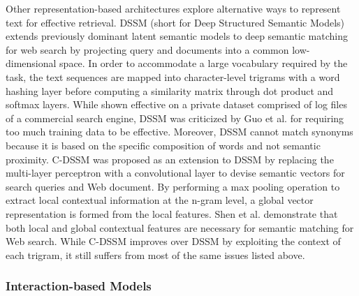 Other representation-based architectures explore alternative ways to represent text for effective retrieval.
DSSM (short for Deep Structured Semantic Models) \cite{huang2013learning} extends previously dominant latent semantic models \cite{blei2003latent, } to deep semantic matching for web search by projecting query and documents into a common low-dimensional space.
In order to accommodate a large vocabulary required by the task, the text sequences are mapped into character-level trigrams with a word hashing layer before computing a similarity matrix through dot product and softmax layers.
While shown effective on a private dataset comprised of log files of a commercial search engine, DSSM was criticized by Guo et al. \cite{guo2017drmm} for requiring too much training data to be effective.
Moreover, DSSM cannot match synonyms because it is based on the specific composition of words and not semantic proximity.
C-DSSM \cite{shen2014learning} was proposed as an extension to DSSM by replacing the multi-layer perceptron with a convolutional layer to devise semantic vectors for search queries and Web document.
By performing a max pooling operation to extract local contextual information at the n-gram level, a global vector representation is formed from the local features.
Shen et al. \cite{shen2014learning} demonstrate that both local and global contextual features are necessary for semantic matching for Web search.
While C-DSSM improves over DSSM by exploiting the context of each trigram, it still suffers from most of the same issues listed above.

\subsubsection{Interaction-based Models}

